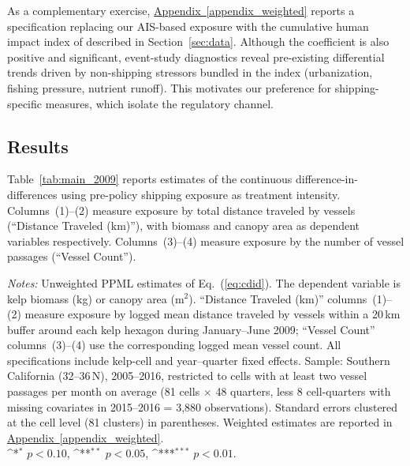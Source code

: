 \documentclass[12pt]{article}
\providecommand{\sym}[1]{\ifmmode^{#1}\else\(^{#1}\)\fi}
\begin{document}
As a complementary exercise, \hyperref[appendix_weighted]{Appendix~\ref*{appendix_weighted}} reports a specification replacing our AIS-based exposure with the cumulative human impact index of \citet{Halpern2009} described in Section~\ref{sec:data}. Although the coefficient is also positive and significant, event-study diagnostics reveal pre-existing differential trends driven by non-shipping stressors bundled in the index (urbanization, fishing pressure, nutrient runoff). This motivates our preference for shipping-specific measures, which isolate the regulatory channel.

\subsection{Results}

Table~\ref{tab:main_2009} reports estimates of the continuous difference-in-differences using pre-policy shipping exposure as treatment intensity. Columns~(1)--(2) measure exposure by total distance traveled by vessels (``Distance Traveled (km)''), with biomass and canopy area as dependent variables respectively. Columns~(3)--(4) measure exposure by the number of vessel passages (``Vessel Count'').

\begin{table}[H]
  \centering
  \caption{Continuous difference-in-differences: Kelp outcomes and the 2009 ECA}
  \label{tab:main_2009}
  
  \vspace{0.5em}

  \begin{minipage}{\linewidth}
  \footnotesize
  \textit{Notes:} Unweighted PPML estimates of Eq.~(\ref{eq:cdid}). The dependent variable is kelp biomass (kg) or canopy area (m$^{2}$). ``Distance Traveled (km)'' columns~(1)--(2) measure exposure by logged mean distance traveled by vessels within a 20\,km buffer around each kelp hexagon during January--June 2009; ``Vessel Count'' columns~(3)--(4) use the corresponding logged mean vessel count. All specifications include kelp-cell and year--quarter fixed effects. Sample: Southern California (32\textdegree--36\textdegree\,N), 2005--2016, restricted to cells with at least two vessel passages per month on average (81 cells $\times$ 48 quarters, less 8 cell-quarters with missing covariates in 2015--2016 = 3,880 observations). Standard errors clustered at the cell level (81 clusters) in parentheses. Weighted estimates are reported in \hyperref[appendix_weighted]{Appendix~\ref*{appendix_weighted}}.\\
  \sym{*} \(p<0.10\), \sym{**} \(p<0.05\), \sym{***} \(p<0.01\).
  \end{minipage}
\end{table}
\end{document}
